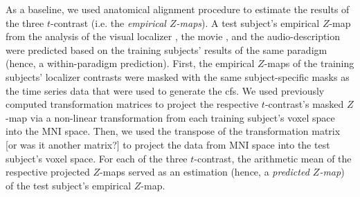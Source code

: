 %
As a baseline, we used anatomical alignment procedure to estimate the results of
the three $t$-contrast (i.e. the \textit{empirical $Z$-maps}).
%
A test subject's empirical $Z$-map from the analysis of
%
the visual localizer \citep{sengupta2016extension},
%
the movie \citep{haeusler2022processing}, and
%
the audio-description \citep{haeusler2022processing}
%
were predicted based on the training subjects' results of the same paradigm
(hence, a within-paradigm prediction).
%
First, the empirical $Z$-maps of the training subjects' localizer contrasts were
masked with the same subject-specific masks as the time series data that were
used to generate the \ac{cfs}.
We used previously computed transformation matrices
\citep[][\href{https://github.com/psychoinformatics-de/studyforrest-data-templatetransforms}{\url{github.com/psychoinformatics-de/studyforrest-data-templatetransforms}}]{hanke2014audiomovie}
to project the respective $t$-contrast's masked $Z$-map via a non-linear
transformation from each training subject's voxel space into the MNI space.
Then, we  used the transpose of the transformation matrix [or was it another
matrix?] to project the data from MNI space into the test subject's voxel space.
For each of the three $t$-contrast, the arithmetic mean of the respective
projected $Z$-maps served as an estimation (hence, a \textit{predicted $Z$-map})
of the test subject's empirical $Z$-map.



